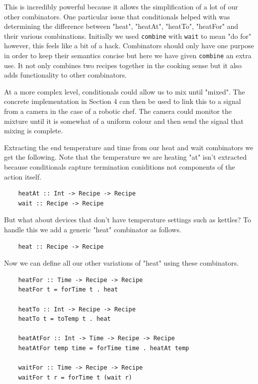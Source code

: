 \documentclass[11pt]{article}
\begin{document}
This is incredibly powerful because it allows the simplification of a lot of our other
combinators. One particular issue that conditionals helped with was determining the
difference between "heat", "heatAt", "heatTo", "heatFor" and their various combinations.
Initially we used \texttt{combine} with \texttt{wait} to mean "do for" however, this
feels like a bit of a hack. Combinators should only have one purpose in order to keep
their semantics concise but here we have given \texttt{combine} an extra use. It not
only combines two recipes together in the cooking sense but it also adds functionality
to other combinators.

\medbreak

At a more complex level, conditionals could allow us to mix until "mixed".
The concrete implementation in Section 4 can then be used to link this to a signal
from a camera in the case of a robotic chef. The camera could monitor the mixture
until it is somewhat of a uniform colour and then send the signal that mixing is complete.

\medbreak

Extracting the end temperature and time from our heat and wait combinators we get the
following. Note that the temperature we are heating "at" isn't extracted because
conditionals capture termination coniditions not components of the action itself.

\begin{lstlisting}
    heatAt :: Int -> Recipe -> Recipe
    wait :: Recipe -> Recipe
\end{lstlisting}

But what about devices that don't have temperature settings such as kettles? To handle
this we add a generic "heat" combinator as follows.

\begin{lstlisting}
    heat :: Recipe -> Recipe
\end{lstlisting}

Now we can define all our other variations of "heat" using these combinators.

\begin{lstlisting}
    heatFor :: Time -> Recipe -> Recipe
    heatFor t = forTime t . heat

    heatTo :: Int -> Recipe -> Recipe
    heatTo t = toTemp t . heat

    heatAtFor :: Int -> Time -> Recipe -> Recipe
    heatAtFor temp time = forTime time . heatAt temp

    waitFor :: Time -> Recipe -> Recipe
    waitFor t r = forTime t (wait r)
\end{lstlisting}
\end{document}
